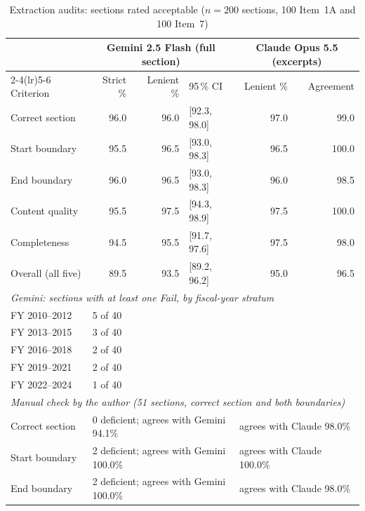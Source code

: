 \begin{table}[htbp]
  \centering
  \small
  \caption{Extraction audits: sections rated acceptable ($n = 200$ sections, 100 Item~1A and 100 Item~7)}
  \label{tab:ai_validation}
  \begin{tabular}{l r r l r r}
    \toprule
    & \multicolumn{3}{c}{Gemini 2.5 Flash (full section)} & \multicolumn{2}{c}{Claude Opus 5.5 (excerpts)} \\
    \cmidrule(lr){2-4}\cmidrule(lr){5-6}
    Criterion & Strict \% & Lenient \% & 95\,\% CI & Lenient \% & Agreement \\
    \midrule
    Correct section & 96.0 & 96.0 & [92.3, 98.0] & 97.0 & 99.0 \\
    Start boundary & 95.5 & 96.5 & [93.0, 98.3] & 96.5 & 100.0 \\
    End boundary & 96.0 & 96.5 & [93.0, 98.3] & 96.0 & 98.5 \\
    Content quality & 95.5 & 97.5 & [94.3, 98.9] & 97.5 & 100.0 \\
    Completeness & 94.5 & 95.5 & [91.7, 97.6] & 97.5 & 98.0 \\
    \midrule
    Overall (all five) & 89.5 & 93.5 & [89.2, 96.2] & 95.0 & 96.5 \\
    \midrule
    \multicolumn{6}{l}{\emph{Gemini: sections with at least one Fail, by fiscal-year stratum}} \\
    \quad FY 2010--2012 & \multicolumn{5}{l}{5 of 40} \\
    \quad FY 2013--2015 & \multicolumn{5}{l}{3 of 40} \\
    \quad FY 2016--2018 & \multicolumn{5}{l}{2 of 40} \\
    \quad FY 2019--2021 & \multicolumn{5}{l}{2 of 40} \\
    \quad FY 2022--2024 & \multicolumn{5}{l}{1 of 40} \\
    \midrule
    \multicolumn{6}{l}{\emph{Manual check by the author (51 sections, correct section and both boundaries)}} \\
    \quad Correct section & \multicolumn{3}{l}{0 deficient; agrees with Gemini 94.1\%} & \multicolumn{2}{l}{agrees with Claude 98.0\%} \\
    \quad Start boundary & \multicolumn{3}{l}{2 deficient; agrees with Gemini 100.0\%} & \multicolumn{2}{l}{agrees with Claude 100.0\%} \\
    \quad End boundary & \multicolumn{3}{l}{2 deficient; agrees with Gemini 100.0\%} & \multicolumn{2}{l}{agrees with Claude 98.0\%} \\

\end{tabular}
\end{table}
